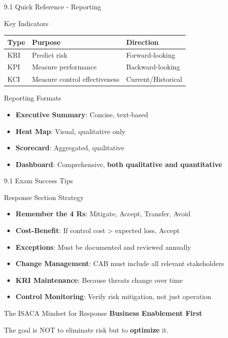 \documentclass{beamer}
\begin{document}
	\begin{frame}{9.1 Quick Reference - Reporting}
		\begin{block}{Key Indicators}
			\begin{tabular}{|p{2.5cm}|p{4cm}|p{4.5cm}|}
				\hline
				\textbf{Type} & \textbf{Purpose} & \textbf{Direction} \\
				\hline
				KRI & Predict risk & Forward-looking \\
				\hline
				KPI & Measure performance & Backward-looking \\
				\hline
				KCI & Measure control effectiveness & Current/Historical \\
				\hline
			\end{tabular}
		\end{block}
		
		\begin{block}{Reporting Formats}
			\begin{itemize}
				\item \textbf{Executive Summary}: Concise, text-based
				\item \textbf{Heat Map}: Visual, qualitative only
				\item \textbf{Scorecard}: Aggregated, qualitative
				\item \textbf{Dashboard}: Comprehensive, \textbf{both qualitative and quantitative}
			\end{itemize}
		\end{block}
	\end{frame}
	
	\begin{frame}{9.1 Exam Success Tips}
		\begin{block}{Response Section Strategy}
			\begin{itemize}
				\item \textbf{Remember the 4 Rs}: Mitigate, Accept, Transfer, Avoid
				\item \textbf{Cost-Benefit}: If control cost > expected loss, Accept
				\item \textbf{Exceptions}: Must be documented and reviewed annually
				\item \textbf{Change Management}: CAB must include all relevant stakeholders
				\item \textbf{KRI Maintenance}: Because threats change over time
				\item \textbf{Control Monitoring}: Verify risk mitigation, not just operation
			\end{itemize}
		\end{block}
		
		\begin{exampleblock}{The ISACA Mindset for Response}
			\centering
			\Large{\textbf{Business Enablement First}}
			
			\normalsize{The goal is NOT to eliminate risk but to \textbf{optimize} it.}
		\end{exampleblock}
	\end{frame}
	
\end{document}
